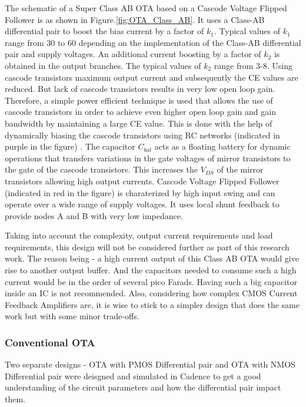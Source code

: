 The schematic of a Super Class AB OTA based on a Cascode Voltage Flipped Follower is as shown in Figure.\ref{fig:OTA_Class_AB}. It uses a Class-AB differential pair to boost the bias current by a factor of $k_1$. Typical values of $k_1$ range from 30 to 60 depending on the implementation of the Class-AB differential pair and supply voltages. An additional current boosting by a factor of $k_2$ is obtained in the output branches. The typical values of $k_2$ range from 3-8. Using cascode transistors maximum output current and subsequently the CE values are reduced. But lack of cascode transistors results in very low open loop gain. Therefore, a simple power efficient technique is used that allows the use of cascode transistors in order to achieve even higher open loop gain and gain bandwidth by maintaining a large CE value. This is done with the help of dynamically biasing the cascode transistors using RC networks (indicated in purple in the figure) \cite{super_class_ab}. The capacitor $C_{bat}$ acts as a floating battery for dynamic operations that transfers variations in the gate voltages of mirror transistors to the gate of the cascode transistors. This increases the $V_{DS}$ of the mirror transistors allowing high output currents. Cascode Voltage Flipped Follower (indicated in red in the figure) is charaterized by high input swing and can operate over a wide range of supply voltages. It uses local shunt feedback to provide nodes A and B with very low impedance.

Taking into account the complexity, output current requirements and load requirements, this design will not be considered further as part of this research work. The reason being - a high current output of this Class AB OTA would give rise to another output buffer. And the capacitors needed to consume such a high current would be in the order of several pico Farads. Having such a big capacitor inside an IC is not recommended. Also, considering how complex CMOS Current Feedback Amplifiers are, it is wise to stick to a simpler design that does the same work but with some minor trade-offs.

\subsubsection{Conventional OTA}
Two separate designs - OTA with PMOS Differential pair and OTA with NMOS Differential pair were deisgned and simulated in Cadence to get a good understanding of the circuit parameters and how the differential pair impact them. 


